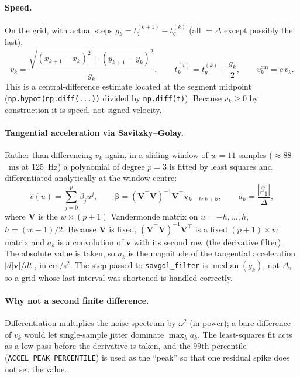 \documentclass[11pt,a4paper]{article}
\newcommand{\code}[1]{\texttt{\small #1}}
\begin{document}
\paragraph{Speed.} On the grid, with actual steps
$g_k = t_g^{(k+1)} - t_g^{(k)}$ (all $= \Delta$ except possibly the last),
\begin{equation}
  v_k = \frac{\sqrt{(x_{k+1}-x_k)^2 + (y_{k+1}-y_k)^2}}{g_k},
  \qquad
  t_k^{(v)} = t_g^{(k)} + \frac{g_k}{2},
  \qquad
  v_k^{\text{cm}} = c\,v_k .
  \label{eq:speed}
\end{equation}
This is a central-difference estimate located at the segment midpoint
(\code{np.hypot(np.diff(...))} divided by \code{np.diff(t)}). Because
$v_k \ge 0$ by construction it is speed, not signed velocity.

\paragraph{Tangential acceleration via Savitzky--Golay.} Rather than
differencing $v_k$ again, in a sliding window of $w = 11$ samples
($\approx 88$~ms at 125~Hz) a polynomial of degree $p = 3$ is fitted by least
squares and differentiated analytically at the window centre:
\begin{equation}
  \hat v(u) = \sum_{j=0}^{p}\beta_j u^j,
  \qquad
  \bm{\beta} = (\bm{V}^{\!\top}\bm{V})^{-1}\bm{V}^{\!\top}\bm{v}_{k-h:k+h},
  \qquad
  a_k = \frac{|\beta_1|}{\Delta},
  \label{eq:savgol}
\end{equation}
where $\bm{V}$ is the $w \times (p+1)$ Vandermonde matrix on
$u = -h, \dots, h$, $h = (w-1)/2$. Because $\bm{V}$ is fixed,
$(\bm{V}^{\!\top}\bm{V})^{-1}\bm{V}^{\!\top}$ is a fixed $(p+1)\times w$ matrix
and $a_k$ is a convolution of $\bm{v}$ with its second row (the derivative
filter). The absolute value is taken, so $a_k$ is the magnitude of the
tangential acceleration $|d|\bm{v}|/dt|$, in cm/s$^2$. The step passed to
\code{savgol\_filter} is $\operatorname{median}(g_k)$, not $\Delta$, so a grid
whose last interval was shortened is handled correctly.

\paragraph{Why not a second finite difference.} Differentiation multiplies the
noise spectrum by $\omega^2$ (in power); a bare difference of $v_k$ would let
single-sample jitter dominate $\max_k a_k$. The least-squares fit acts as a
low-pass before the derivative is taken, and the 99th percentile
(\code{ACCEL\_PEAK\_PERCENTILE}) is used as the ``peak'' so that one residual
spike does not set the value.
\end{document}
